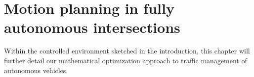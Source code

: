 \documentclass{report}
\theoremstyle{definition}
\theoremstyle{plain}
\begin{document}





\chapter{Motion planning in fully autonomous intersections}\label{chap:single}

Within the controlled environment sketched in the introduction, this chapter will
further detail our mathematical optimization approach to traffic management of
autonomous vehicles.
\end{document}
